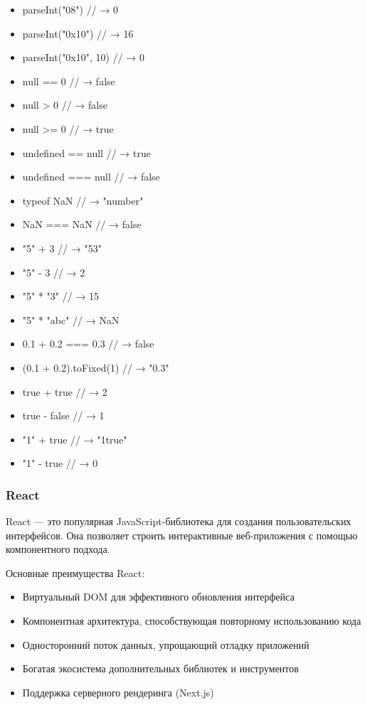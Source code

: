 \begin{itemize}
  \item parseInt("08") // → 0
  \item parseInt("0x10") // → 16
  \item parseInt("0x10", 10) // → 0
  \item null == 0 // → false
  \item null > 0 // → false
  \item null >= 0 // → true
  \item undefined == null // → true
  \item undefined === null // → false
  \item typeof NaN // → "number"
  \item NaN === NaN // → false
  \item "5" + 3 // → "53"
  \item "5" - 3 // → 2
  \item "5" * "3" // → 15
  \item "5" * "abc" // → NaN
  \item 0.1 + 0.2 === 0.3 // → false
  \item (0.1 + 0.2).toFixed(1) // → "0.3"
  \item true + true // → 2
  \item true - false // → 1
  \item "1" + true // → "1true"
  \item "1" - true // → 0
\end{itemize}

\subsubsection{React}
React — это популярная JavaScript-библиотека для создания пользовательских интерфейсов. Она позволяет строить интерактивные веб-приложения с помощью компонентного подхода.

Основные преимущества React:
\begin{itemize}
\item Виртуальный DOM для эффективного обновления интерфейса
\item Компонентная архитектура, способствующая повторному использованию кода
\item Односторонний поток данных, упрощающий отладку приложений
\item Богатая экосистема дополнительных библиотек и инструментов
\item Поддержка серверного рендеринга (Next.js)
\end{itemize}

